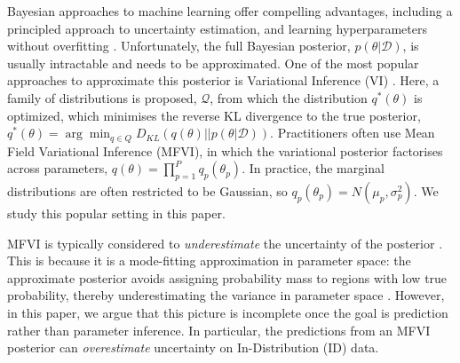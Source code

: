 \documentclass{article}
\theoremstyle{plain}
\theoremstyle{definition}
\theoremstyle{remark}
\theoremstyle{plain}
\newcommand{\data}{\mathcal{D}}
\newcommand{\KL}[2]{D_{KL}\left(#1||#2\right)}
\begin{document}
Bayesian approaches to machine learning offer compelling advantages, including a principled approach to uncertainty estimation, and learning hyperparameters without overfitting \cite{mackay1992bayesian}.
Unfortunately, the full Bayesian posterior, $p(\theta| \data)$, is usually intractable and needs to be approximated. 
One of the most popular approaches to approximate this posterior is Variational Inference (VI) \cite{jordan1999introduction, blei2017variational}. Here, a family of distributions is proposed, $\mathcal{Q}$, from which the distribution $q^*(\theta)$ is optimized, which minimises the reverse KL divergence to the true posterior, $q^*(\theta) = \arg \min_{q\in Q} \KL{ q(\theta)}{p(\theta|\data)}$. Practitioners often use Mean Field Variational Inference (MFVI), in which the variational posterior factorises across parameters, $q(\theta) = \prod_{p=1}^P q_{p}(\theta_p) $. In practice, the marginal distributions are often restricted to be Gaussian, so  $q_{p}(\theta_p)=N(\mu_p, \sigma^2_p)$. We study this popular setting in this paper. 

MFVI is typically considered to \textit{underestimate} the uncertainty of the posterior \cite{minka2005Divergencemeasuresmessage, Turner_Sahani_2011, blei2017variational}. This is because it is a mode-fitting approximation in parameter space: the approximate posterior avoids assigning probability mass to regions with low true probability, thereby underestimating the variance in parameter space \cite{margossian2023shrinkage}. However, in this paper, we argue that this picture is incomplete once the goal is prediction rather than parameter inference. In particular, the predictions from an MFVI posterior can \textit{overestimate} uncertainty on In-Distribution (ID) data.



\end{document}
